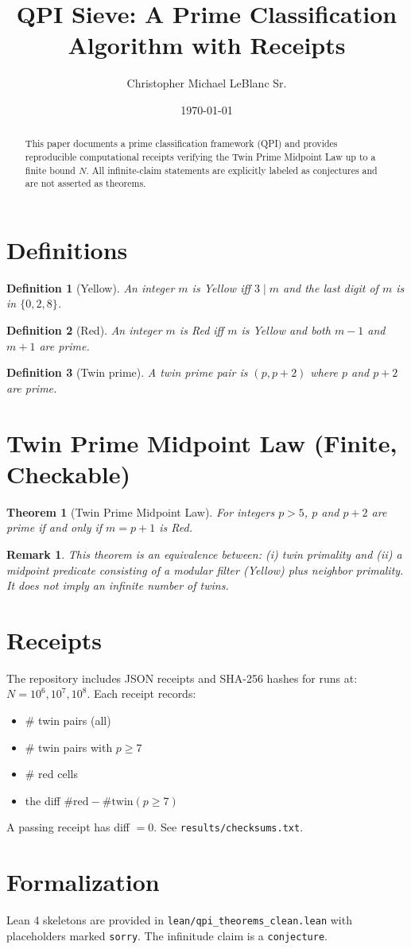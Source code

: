 \documentclass[11pt]{article}
\title{QPI Sieve: A Prime Classification Algorithm with Receipts}
\author{Christopher Michael LeBlanc Sr.}
\date{\today}
\newtheorem{theorem}{Theorem}
\newtheorem{definition}{Definition}
\newtheorem{remark}{Remark}
\begin{document}
\maketitle

\begin{abstract}
This paper documents a prime classification framework (QPI) and provides
reproducible computational receipts verifying the Twin Prime Midpoint Law
up to a finite bound $N$. All infinite-claim statements are explicitly
labeled as conjectures and are not asserted as theorems.
\end{abstract}

\section{Definitions}
\begin{definition}[Yellow]
An integer $m$ is \emph{Yellow} iff $3 \mid m$ and the last digit of $m$ is in $\{0,2,8\}$.
\end{definition}

\begin{definition}[Red]
An integer $m$ is \emph{Red} iff $m$ is Yellow and both $m-1$ and $m+1$ are prime.
\end{definition}

\begin{definition}[Twin prime]
A \emph{twin prime pair} is $(p,p+2)$ where $p$ and $p+2$ are prime.
\end{definition}

\section{Twin Prime Midpoint Law (Finite, Checkable)}
\begin{theorem}[Twin Prime Midpoint Law]
For integers $p>5$, $p$ and $p+2$ are prime if and only if $m=p+1$ is Red.
\end{theorem}

\begin{remark}
This theorem is an equivalence between:
(i) twin primality and (ii) a midpoint predicate consisting of a modular filter (Yellow)
plus neighbor primality. It does not imply an infinite number of twins.
\end{remark}

\section{Receipts}
The repository includes JSON receipts and SHA-256 hashes for runs at:
$N=10^6,10^7,10^8$. Each receipt records:
\begin{itemize}
\item \# twin pairs (all)
\item \# twin pairs with $p\ge 7$
\item \# red cells
\item the diff $\#\text{red}-\#\text{twin}(p\ge 7)$
\end{itemize}
A passing receipt has diff $=0$.
See \texttt{results/checksums.txt}.

\section{Formalization}
Lean 4 skeletons are provided in \texttt{lean/qpi\_theorems\_clean.lean}
with placeholders marked \texttt{sorry}. The infinitude claim is a \texttt{conjecture}.



\end{document}
